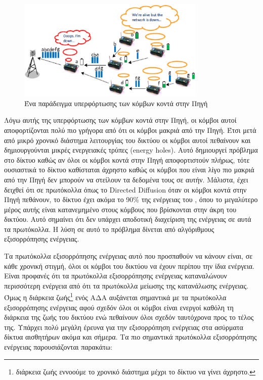 \begin{figure}[h]
	\centering
	\includegraphics[width=0.8\textwidth]{images/energy_holes.eps}
	\caption{Ένα παράδειγμα υπερφόρτωσης των κόμβων κοντά στην Πηγή}
	\label{fig:energy_holes}
\end{figure}

Λόγω αυτής της υπερφόρτωσης των κόμβων κοντά στην Πηγή, οι κόμβοι αυτοί αποφορτίζονται πολύ πιο γρήγορα από ότι οι κόμβοι μακριά από την
Πηγή. Έτσι μετά από μικρό χρονικό διάστημα λειτουργίας του δικτύου οι κόμβοι αυτοί πεθαίνουν και δημιουργούνται μικρές ενεργειακές τρύπες (energy holes). Αυτό
δημιουργεί πρόβλημα στο δίκτυο καθώς αν όλοι οι κόμβοι κοντά στην Πηγή αποφορτιστούν πλήρως, τότε ουσιαστικά το δίκτυο καθίσταται άχρηστο καθώς οι κόμβοι που είναι
λίγο πιο μακριά από την Πηγή δεν μπορούν να στείλουν τα δεδομένα τους σε αυτήν. Μάλιστα, έχει δειχθεί ότι σε πρωτόκολλα όπως το Directed Diffusion όταν οι κόμβοι
κοντά στην Πηγή πεθάνουν, το δίκτυο έχει ακόμα το 90\% της ενέργειας του \cite{energy_holes}, όπου το μεγαλύτερο μέρος αυτής είναι κατανεμημένο στους κόμβους που
βρίσκονται στην άκρη του δικτύου. Αυτό σημαίνει ότι δεν υπάρχει αποδοτική διαχείριση της ενέργειας σε αυτά τα πρωτόκολλα. Η λύση σε αυτό το πρόβλημα δίνεται από
αλγόριθμους εξισορρόπησης ενέργειας.

Τα πρωτόκολλα εξισορρόπησης ενέργειας αυτό που προσπαθούν να κάνουν είναι, σε κάθε χρονική στιγμή, όλοι οι κόμβοι του δικτύου να έχουν περίπου την ίδια ενέργεια.
Είναι προφανές ότι τα πρωτόκολλα εξισορρόπησης ενέργειας καταναλώνουν περισσότερη ενέργεια από ότι τα πρωτόκολλα μείωσης της κατανάλωσης ενέργειας. Όμως η διάρκεια
ζωής\footnote{διάρκεια ζωής εννοούμε το χρονικό διάστημα μέχρι το δίκτυο να γίνει άχρηστο.} ενός ΑΔΑ αυξάνεται σημαντικά με τα πρωτόκολλα εξισορρόπησης ενέργειας
αφού σχεδόν όλοι οι κόμβοι είναι ενεργοί καθόλη τη διάρκεια της ζωής του δικτύου ενώ πεθαίνουν όλοι σχεδόν ταυτόχρονα προς το τέλος της. Υπάρχει πολύ μεγάλη έρευνα
για την εξισορρόπηση ενέργειας στα ασύρματα δίκτυα αισθητήρων ακόμα και σήμερα. Τα πιο σημαντικά πρωτόκολλα
εξισορρόπησης ενέργειας παρουσιάζονται παρακάτω:

